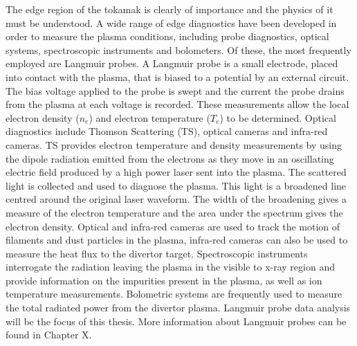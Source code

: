 	The edge region of the tokamak is clearly of importance and the physics of it must be understood. A wide range of edge diagnostics have been developed in order to measure the plasma conditions, including probe diagnostics, optical systems, spectroscopic instruments and bolometers.  Of these, the most frequently employed are Langmuir probes. A Langmuir probe is a small electrode, placed into contact with the plasma, that is biased to a potential by an external circuit. The bias voltage applied to the probe is swept and the current the probe drains from the plasma at each voltage is recorded. These measurements allow the local electron density ($n_e$) and electron temperature ($T_e$) to be determined. Optical diagnostics include Thomson Scattering (TS),  optical cameras and infra-red cameras. TS provides electron temperature and density measurements by using the dipole radiation emitted from the electrons as they move in an oscillating electric field produced by a high power laser sent into the plasma. The scattered light is collected and used to diagnose the plasma. This light is a broadened line centred around the original laser waveform. The width of the broadening gives a measure of the electron temperature and the area under the spectrum gives the electron density. Optical and infra-red cameras are used to track the motion of filaments and dust particles in the plasma, infra-red cameras can also be used to measure the heat flux to the divertor target. Spectroscopic instruments interrogate the radiation leaving the plasma in the visible to x-ray region and provide information on the impurities present in the plasma, as well as ion temperature measurements. Bolometric systems are frequently used to measure the total radiated power from the divertor plasma. Langmuir probe data analysis will be the focus of this thesis. More information about Langmuir probes can be found in Chapter X. 

 




